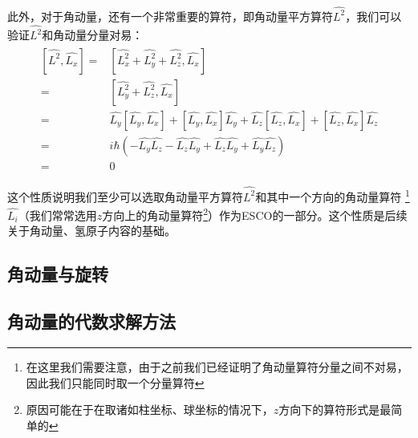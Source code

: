      此外，对于角动量，还有一个非常重要的算符，即角动量平方算符$\hat{L^2}$，我们可以验证$\hat{L^2}$和角动量分量对易：
       \begin{align}
        \begin{split}
            [ \hat{L^2},\hat{L_x} ] =& [\hat{L^2_x}+ \hat{L^2_y} + \hat{L^2_z},\hat{L_x}]\\
          =&[\hat{L^2_y} + \hat{L^2_z},\hat{L_x}]\\
          =& \hat{L_y} [\hat{L_y},\hat{L_x}] + [\hat{L_y},\hat{L_x} ]\hat{L_y}
          + \hat{L_z} [\hat{L_z},\hat{L_x}] + [\hat{L_z},\hat{L_x}] \hat{L_z}\\
          =&i\hbar(-\hat{L_y}\hat{L_z}-\hat{L_z}\hat{L_y}+\hat{L_z}\hat{L_y}+\hat{L_y}
          \hat{L_z})\\
          =&0
        \end{split}
    \end{align}
    
     这个性质说明我们至少可以选取角动量平方算符$\hat{L^2}$和其中一个方向的角动量算符
     \footnote{在这里我们需要注意，由于之前我们已经证明了角动量算符分量之间不对易，因此我们只能同时取一个分量算符}
     $\hat{L_i}$（我们常常选用$z$方向上的角动量算符\footnote{原因可能在于在取诸如柱坐标、球坐标的情况下，$z$方向下的算符形式是最简单的}）作为ESCO的一部分。这个性质是后续关于角动量、氢原子内容的基础。
     
    \subsection{角动量与旋转} \label{section5.2}
 
    \subsection{角动量的代数求解方法}\label{section5.3}
